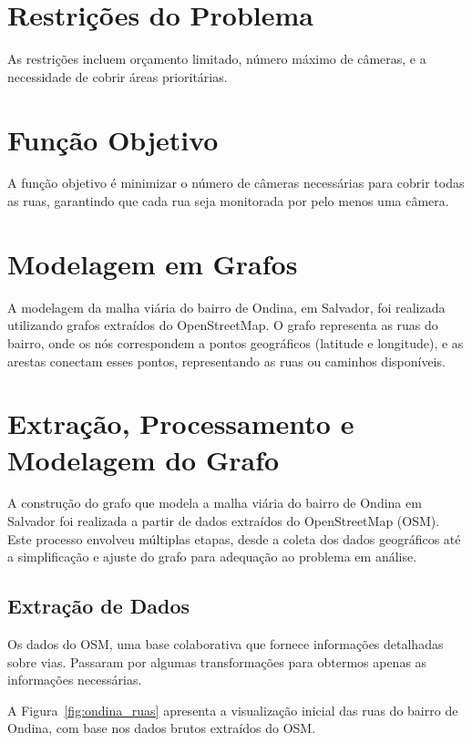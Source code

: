 \documentclass[12pt, a4paper]{report}
\begin{document}
\section{Restrições do Problema}
As restrições incluem orçamento limitado, número máximo de câmeras, e a necessidade de cobrir áreas prioritárias.

\section{Função Objetivo}
A função objetivo é minimizar o número de câmeras necessárias para cobrir todas as ruas, garantindo que cada rua seja monitorada por pelo menos uma câmera.

\section{Modelagem em Grafos}

A modelagem da malha viária do bairro de Ondina, em Salvador, foi realizada utilizando grafos extraídos do OpenStreetMap. O grafo representa as ruas do bairro, onde os nós correspondem a pontos geográficos (latitude e longitude), e as arestas conectam esses pontos, representando as ruas ou caminhos disponíveis.

\section{Extração, Processamento e Modelagem do Grafo}

A construção do grafo que modela a malha viária do bairro de Ondina em Salvador foi realizada a partir de dados extraídos do OpenStreetMap (OSM). Este processo envolveu múltiplas etapas, desde a coleta dos dados geográficos até a simplificação e ajuste do grafo para adequação ao problema em análise.

\subsection{Extração de Dados}

Os dados do OSM, uma base colaborativa que fornece informações detalhadas sobre vias. Passaram por algumas transformações para obtermos apenas as informações necessárias.

A Figura~\ref{fig:ondina_ruas} apresenta a visualização inicial das ruas do bairro de Ondina, com base nos dados brutos extraídos do OSM.
\end{document}
